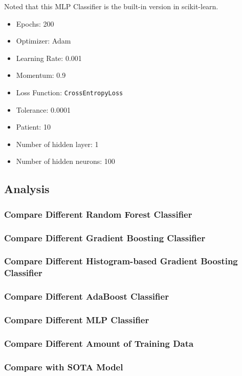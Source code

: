 \documentclass[twocolumn, draft]{extarticle}
\begin{document}
Noted that this MLP Classifier is the built-in version in scikit-learn.

\begin{itemize}
\item Epochs: 200
\item Optimizer: Adam
\item Learning Rate: 0.001
\item Momentum: 0.9
\item Loss Function: \texttt{CrossEntropyLoss}
\item Tolerance: 0.0001
\item Patient: 10
\item Number of hidden layer: 1
\item Number of hidden neurons: 100
\end{itemize}

\subsection{Analysis}

\subsubsection{Compare Different Random Forest Classifier}
\subsubsection{Compare Different Gradient Boosting Classifier}
\subsubsection{Compare Different Histogram-based Gradient Boosting Classifier}
\subsubsection{Compare Different AdaBoost Classifier}
\subsubsection{Compare Different MLP Classifier}
\subsubsection{Compare Different Amount of Training Data}
\subsubsection{Compare with SOTA Model}
\end{document}
